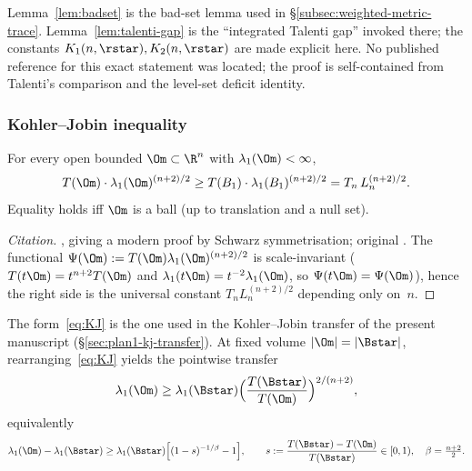\begin{remark}
Lemma~\ref{lem:badset} is the bad-set lemma used in
\S\ref{subsec:weighted-metric-trace}. Lemma~\ref{lem:talenti-gap} is
the ``integrated Talenti gap'' invoked there; the constants
$K_1(n,\rstar),K_2(n,\rstar)$ are made explicit here. No published
reference for this exact statement was located; the proof is
self-contained from Talenti's comparison and the level-set deficit
identity.
\end{remark}

\subsubsection{Kohler--Jobin inequality}\label{ssec:KJ}

\begin{theorem}
\label{thm:KJ}
For every open bounded $\Om\subset\R^n$ with $\lambda_1(\Om)<\infty$,
\begin{equation}\label{eq:KJ}
   T(\Om)\cdot\lambda_1(\Om)^{(n+2)/2}
   \ge T(B_1)\cdot\lambda_1(B_1)^{(n+2)/2}
   =T_n\,L_n^{(n+2)/2}.
\end{equation}
Equality holds iff $\Om$ is a ball (up to translation and a null set).
\end{theorem}

\begin{proof}[Citation]
\cite[Thm.~3.3]{Brasco2014}, giving a modern proof by Schwarz
symmetrisation; original \cite{KohlerJobin1978}. The functional
$\Psi(\Om):=T(\Om)\lambda_1(\Om)^{(n+2)/2}$ is scale-invariant
($T(t\Om)=t^{n+2}T(\Om)$ and $\lambda_1(t\Om)=t^{-2}\lambda_1(\Om)$,
so $\Psi(t\Om)=\Psi(\Om)$), hence the right side is the universal
constant $T_n L_n^{(n+2)/2}$ depending only on~$n$.
\end{proof}

\begin{remark}
\label{rem:KJ-norm}
The form~\eqref{eq:KJ} is the one used in the Kohler--Jobin transfer
of the present manuscript
(\S\ref{sec:plan1-kj-transfer}). At
fixed volume $|\Om|=|\Bstar|$, rearranging~\eqref{eq:KJ} yields the
pointwise transfer
\begin{equation}\label{eq:KJ-ptwise}
   \lambda_1(\Om)
   \ge\lambda_1(\Bstar)
   \Bigl(\frac{T(\Bstar)}{T(\Om)}\Bigr)^{2/(n+2)},
\end{equation}
equivalently
\begin{equation}\label{eq:KJ-deficit}
   \lambda_1(\Om)-\lambda_1(\Bstar)
   \ge\lambda_1(\Bstar)\Bigl[(1-s)^{-1/\beta}-1\Bigr],
   \qquad
   s:=\frac{T(\Bstar)-T(\Om)}{T(\Bstar)}\in[0,1),
   \quad\beta=\tfrac{n+2}{2}.
\end{equation}
\end{remark}

